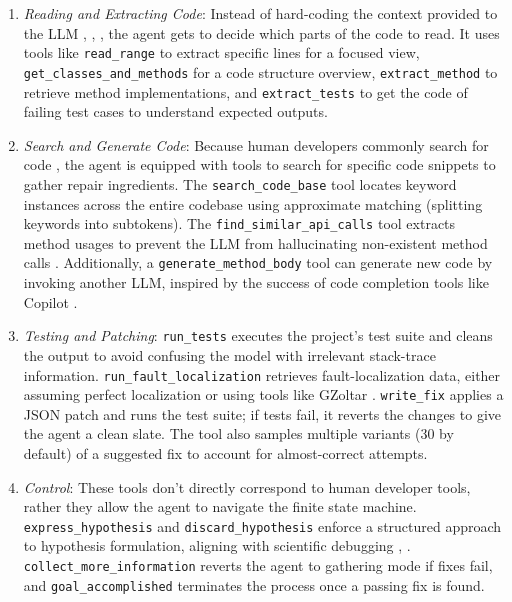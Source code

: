 \documentclass[manuscript,review]{acmart}
\begin{document}
\begin{enumerate}[label=\alph*)]
  \item \textit{Reading and Extracting Code}: Instead of hard-coding the context provided to the LLM \cite{xia2023keep}, \cite{kang2023explainable}, \cite{ye2024iter}, the agent gets to decide which parts of the code to read. It uses tools like \texttt{read\_range} to extract specific lines for a focused view, \texttt{get\_classes\_and\_methods} for a code structure overview, \texttt{extract\_method} to retrieve method implementations, and \texttt{extract\_tests} to get the code of failing test cases to understand expected outputs.
  \item \textit{Search and Generate Code}: Because human developers commonly search for code \cite{grazia2023code}, the agent is equipped with tools to search for specific code snippets to gather repair ingredients. The \texttt{search\_code\_base} tool locates keyword instances across the entire codebase using approximate matching (splitting keywords into subtokens). The \texttt{find\_similar\_api\_calls} tool extracts method usages to prevent the LLM from hallucinating non-existent method calls \cite{eghbali2024de}. Additionally, a \texttt{generate\_method\_body} tool can generate new code by invoking another LLM, inspired by the success of code completion tools like Copilot \cite{chen2021evaluating}.
  \item \textit{Testing and Patching}: \texttt{run\_tests} executes the project's test suite and cleans the output to avoid confusing the model with irrelevant stack-trace information. \texttt{run\_fault\_localization} retrieves fault-localization data, either assuming perfect localization or using tools like GZoltar \cite{campos2012gzoltar}. \texttt{write\_fix} applies a JSON patch and runs the test suite; if tests fail, it reverts the changes to give the agent a clean slate. The tool also samples multiple variants (30 by default) of a suggested fix to account for almost-correct attempts.
  \item \textit{Control}: These tools don't directly correspond to human developer tools, rather they allow the agent to navigate the finite state machine. \texttt{express\_hypothesis} and \texttt{discard\_hypothesis} enforce a structured approach to hypothesis formulation, aligning with scientific debugging \cite{zeller2009why}, \cite{kang2023explainable}. \texttt{collect\_more\_information} reverts the agent to gathering mode if fixes fail, and \texttt{goal\_accomplished} terminates the process once a passing fix is found.
\end{enumerate}
\end{document}
